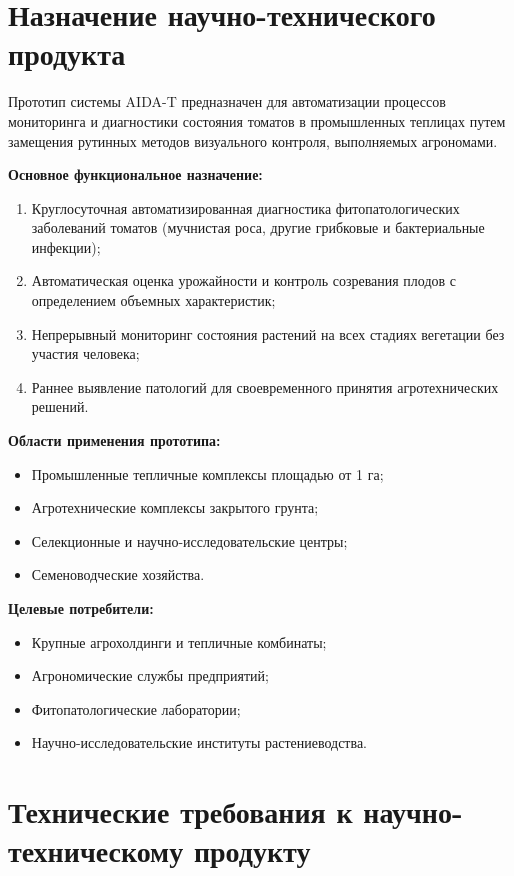\documentclass[12pt,a4paper]{article}
\begin{document}
\section{Назначение научно-технического продукта}

Прототип системы AIDA-T предназначен для автоматизации процессов мониторинга и диагностики состояния томатов в промышленных теплицах путем замещения рутинных методов визуального контроля, выполняемых агрономами.

\textbf{Основное функциональное назначение:}

\begin{enumerate}
\item Круглосуточная автоматизированная диагностика фитопатологических заболеваний томатов (мучнистая роса, другие грибковые и бактериальные инфекции);
\item Автоматическая оценка урожайности и контроль созревания плодов с определением объемных характеристик;
\item Непрерывный мониторинг состояния растений на всех стадиях вегетации без участия человека;
\item Раннее выявление патологий для своевременного принятия агротехнических решений.
\end{enumerate}

\textbf{Области применения прототипа:}
\begin{itemize}
\item Промышленные тепличные комплексы площадью от 1 га;
\item Агротехнические комплексы закрытого грунта;
\item Селекционные и научно-исследовательские центры;
\item Семеноводческие хозяйства.
\end{itemize}

\textbf{Целевые потребители:}
\begin{itemize}
\item Крупные агрохолдинги и тепличные комбинаты;
\item Агрономические службы предприятий;
\item Фитопатологические лаборатории;
\item Научно-исследовательские институты растениеводства.
\end{itemize}

\section{Технические требования к научно-техническому продукту}
\end{document}
